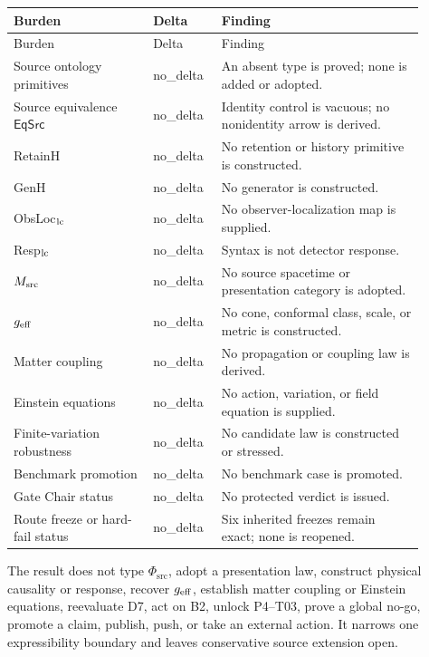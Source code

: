 \documentclass[11pt]{article}
\newcommand{\EqSrc}{\mathsf{EqSrc}}
\newcommand{\status}[1]{\textsf{#1}}
\begin{document}
\begin{longtable}{P{0.31\linewidth}P{0.14\linewidth}P{0.45\linewidth}}
\toprule
Burden & Delta & Finding \\
\midrule
\endfirsthead
\toprule
Burden & Delta & Finding \\
\midrule
\endhead
Source ontology primitives & \status{no\_delta} & An absent type is proved; none is added or adopted. \\
Source equivalence \(\EqSrc\) & \status{no\_delta} & Identity control is vacuous; no nonidentity arrow is derived. \\
RetainH & \status{no\_delta} & No retention or history primitive is constructed. \\
GenH & \status{no\_delta} & No generator is constructed. \\
ObsLoc\(_{\rm lc}\) & \status{no\_delta} & No observer-localization map is supplied. \\
Resp\(_{\rm lc}\) & \status{no\_delta} & Syntax is not detector response. \\
\(M_{\rm src}\) & \status{no\_delta} & No source spacetime or presentation category is adopted. \\
\(g_{\rm eff}\) & \status{no\_delta} & No cone, conformal class, scale, or metric is constructed. \\
Matter coupling & \status{no\_delta} & No propagation or coupling law is derived. \\
Einstein equations & \status{no\_delta} & No action, variation, or field equation is supplied. \\
Finite-variation robustness & \status{no\_delta} & No candidate law is constructed or stressed. \\
Benchmark promotion & \status{no\_delta} & No benchmark case is promoted. \\
Gate Chair status & \status{no\_delta} & No protected verdict is issued. \\
Route freeze or hard-fail status & \status{no\_delta} & Six inherited freezes remain exact; none is reopened. \\
\bottomrule
\end{longtable}

The result does not type \(\Phi_{\mathrm{src}}\), adopt a presentation law,
construct physical causality or response, recover \(g_{\rm eff}\), establish
matter coupling or Einstein equations, reevaluate D7, act on B2, unlock
P4--T03, prove a global no-go, promote a claim, publish, push, or take an
external action.  It narrows one expressibility boundary and leaves
conservative source extension open.
\end{document}
